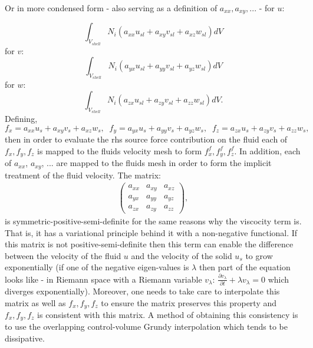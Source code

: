 Or in more condensed form - also serving as a definition of $a_{xx}, a_{xy},...$ -
for $u$:

\begin{equation}
\int_{V_{shell}}
N_i ( a_{xx} u_{sl} + a_{xy} v_{sl} + a_{xz} w_{sl} ) dV
\label{as-for-x}
\end{equation}
for $v$:
\begin{equation}
\int_{V_{shell}}
N_i ( a_{yx} u_{sl} + a_{yy} v_{sl} + a_{yz} w_{sl} ) dV
\label{as-for-y}
\end{equation}
for $w$:
\begin{equation}
\int_{V_{shell}}
N_i ( a_{zx} u_{sl} + a_{zy} v_{sl} + a_{zz} w_{sl} ) dV.
\label{as-for-z}
\end{equation}
Defining,
\begin{equation}
f_x=a_{xx} u_{s} + a_{xy} v_{s} + a_{xz} w_{s}, \;\;
f_y=a_{yx} u_{s} + a_{yy} v_{s} + a_{yz} w_{s}, \;\;
f_z=a_{zx} u_{s} + a_{zy} v_{s} + a_{zz} w_{s},
\label{as-for-f}
\end{equation}
then in order to evaluate the rhs source force contribution on the
fluid each of $f_x, f_y, f_z$ is mapped to the fluids velocity mesh
to form $f_x^f, f_y^f, f_z^f$. In addition, each of $a_{xx}$, $a_{xy}$, ...
are mapped to the fluids mesh in order to form the implicit treatment
of the fluid velocity.
The matrix:
\begin{eqnarray}
\begin{pmatrix}
a_{xx} & a_{xy} & a_{xz} \\
a_{yx} & a_{yy} & a_{yz} \\
a_{zx} & a_{zy} & a_{zz}
\end{pmatrix},
\end{eqnarray}
is symmetric-positive-semi-definite for the same reasons why the viscocity term
is. That is, it has a variational principle behind it with a non-negative functional.
If this matrix is not positive-semi-definite then this term can enable the
difference between the velocity of the fluid $u$ and the velocity of the solid $u_s$ to grow
exponentially (if one of the negative eigen-values is $\lambda$ then part of the equation looks like
- in Riemann space with a Riemann variable $v_\lambda$: $\frac{\partial v_\lambda}{\partial t} +\lambda v_\lambda=0$ which diverges exponentially).
Moreover, one needs to take care to interpolate this matrix as well as $f_x, f_y, f_z$
to ensure the  matrix preserves this property and $f_x, f_y, f_z$  is consistent with this matrix.
A method of obtaining this consistency is to use the overlapping control-volume Grundy interpolation which
tends to be dissipative.








